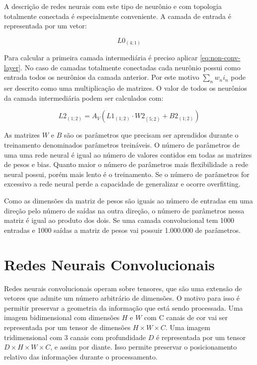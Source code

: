 A descrição de redes neurais com este tipo de neurônio e com topologia
totalmente conectada é especialmente conveniente. A camada de entrada é
representada por um vetor:

\begin{equation} \label{eq:l0}
	L0_{(4;1)}
\end{equation}

Para calcular a primeira camada intermediária é preciso aplicar
\ref{eq:non-conv-layer}. No caso de camadas totalmente conectadas cada
neurônio possui como entrada todos os
neurônios da camada anterior. Por este motivo $\sum_n w_n i_n$ pode ser
descrito como uma multiplicação de matrizes. O valor de todos os neurônios
da camada intermediária podem ser calculados com:

\begin{equation}
	L2_{(1;2)}=A_V \left( L1_{(1;2)} \cdot W2_{(5;2)} + B2_{(1;2)} \right)
\end{equation}

As matrizes $W$ e $B$ são os parâmetros que precisam ser aprendidos durante o
treinamento denominados parâmetros treináveis. O número de parâmetros de uma uma
rede neural é igual ao número de valores contidos em todas as matrizes de pesos
e bias. Quanto maior o número de parâmetros mais flexibilidade a rede neural
possui, porém mais lento é o treinamento. Se o número de parâmetros for
excessivo a rede neural perde a capacidade de generalizar e ocorre overfitting.

Como as dimensões da matriz de pesos são iguais ao número de entradas em uma
direção pelo número de saídas na outra direção, o número de parâmetros nessa
matriz é igual ao produto dos dois. Se uma camada convolucional tem 1000
entradas e 1000 saídas a matriz de pesos vai possuir 1.000.000 de parâmetros.

\section{Redes Neurais Convolucionais}
Redes neurais convolucionais operam sobre tensores, que são uma extensão de
vetores que admite um número arbitrário de dimensões. O motivo para isso é
permitir preservar a geometria da informação que está sendo processada. Uma
imagem bidimensional com dimensões $H$ e $W$ com C canais de cor vai ser
representada por um tensor de dimensões $H \times W \times C$. Uma imagem
tridimensional com 3
canais com profundidade $D$ é representada por um tensor
$D \times H \times W \times C$, e assim por
diante. Isso permite preservar o posicionamento relativo das informações durante
o processamento.

